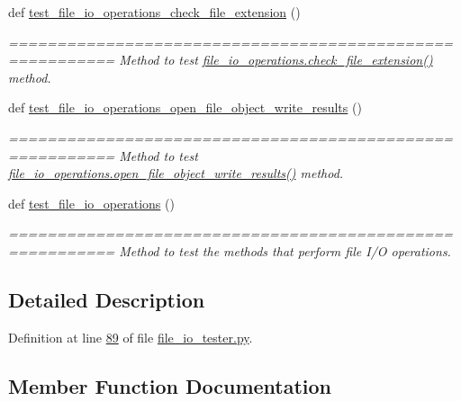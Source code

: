 \begin{DoxyCompactItemize}
def \hyperlink{classutilities_1_1file__io__tester_1_1file__io__operations__tester_aeacc9602a024e8f2b6701b9305ffc930}{test\+\_\+file\+\_\+io\+\_\+operations\+\_\+check\+\_\+file\+\_\+extension} ()
\begin{DoxyCompactList}\small\item\em ========================================================= Method to test \hyperlink{classutilities_1_1file__io_1_1file__io__operations_a902e9fd0dc0da35e3b374deae44051c6}{file\+\_\+io\+\_\+operations.\+check\+\_\+file\+\_\+extension()} method. \end{DoxyCompactList}\item 
def \hyperlink{classutilities_1_1file__io__tester_1_1file__io__operations__tester_a7fa460b989d5a77396a182df39255eba}{test\+\_\+file\+\_\+io\+\_\+operations\+\_\+open\+\_\+file\+\_\+object\+\_\+write\+\_\+results} ()
\begin{DoxyCompactList}\small\item\em ========================================================= Method to test \hyperlink{classutilities_1_1file__io_1_1file__io__operations_ad091638ea961413dba6775d065c0d589}{file\+\_\+io\+\_\+operations.\+open\+\_\+file\+\_\+object\+\_\+write\+\_\+results()} method. \end{DoxyCompactList}\item 
def \hyperlink{classutilities_1_1file__io__tester_1_1file__io__operations__tester_a874961b1543ff59a1b1ea4b40abca8d2}{test\+\_\+file\+\_\+io\+\_\+operations} ()
\begin{DoxyCompactList}\small\item\em ========================================================= Method to test the methods that perform file I/\+O operations. \end{DoxyCompactList}\end{DoxyCompactItemize}


\subsection{Detailed Description}


Definition at line \hyperlink{file__io__tester_8py_source_l00089}{89} of file \hyperlink{file__io__tester_8py_source}{file\+\_\+io\+\_\+tester.\+py}.



\subsection{Member Function Documentation}
\hypertarget{classutilities_1_1file__io__tester_1_1file__io__operations__tester_a874961b1543ff59a1b1ea4b40abca8d2}{}
